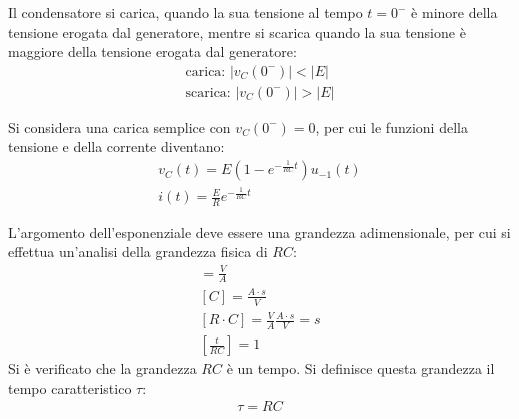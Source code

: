 \documentclass{article}
\numberwithin{equation}{subsection}
\begin{document}
Il condensatore si carica, quando la sua tensione al tempo $t=0^-$ è minore della tensione erogata dal generatore, mentre si scarica quando la sua tensione è maggiore della 
tensione erogata dal generatore:
\begin{gather*}
    \mbox{carica: }|v_C(0^-)|<|E|\\
    \mbox{scarica: }|v_C(0^-)|>|E|
\end{gather*}

Si considera una carica semplice con $v_C(0^-)=0$, per cui le funzioni della tensione e della corrente diventano:
\begin{gather*}
    v_C(t)=E\left(1-e^{-\frac{1}{RC}t}\right)u_{-1}(t)\\
    i(t)=\displaystyle\frac{E}{R}e^{-\frac{1}{RC}t}
\end{gather*}

L'argomento dell'esponenziale deve essere una grandezza adimensionale, per cui si effettua un'analisi della grandezza fisica di $RC$:
\begin{gather*}
    [R]=\displaystyle\frac{V}{A}\\
    [C]=\displaystyle\frac{A\cdot s}{V}\\
    [R\cdot C]=\displaystyle\frac{V}{A}\frac{A\cdot s}{V}=s\\
    \left[\displaystyle\frac{t}{RC}\right]=1  
\end{gather*}
Si è verificato che la grandezza $RC$ è un tempo. Si definisce questa grandezza il tempo caratteristico $\tau$:
\begin{gather*}
    \tau=RC
\end{gather*}
\end{document}
